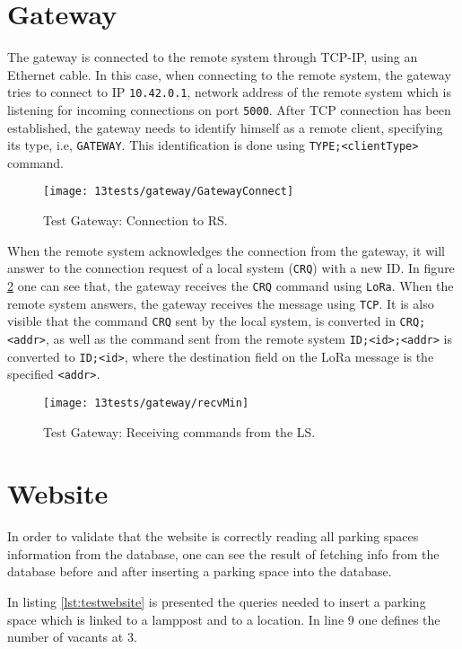 \section{Gateway}
The gateway is connected to the remote system through TCP-IP, using an Ethernet cable. In this case, when connecting to the remote system, the gateway tries to connect to IP \verb|10.42.0.1|, network address of the remote system which is listening for incoming connections on port \verb|5000|. After TCP connection has been established, the gateway needs to identify himself as a remote client, specifying its type, i.e, \verb|GATEWAY|. This identification is done using \verb|TYPE;<clientType>| command.

\begin{figure}[H]
	\centering	
	\texttt{[image: 13tests/gateway/GatewayConnect]}
	\caption{Test Gateway: Connection to RS.}
	\label{fig:}
\end{figure}

When the remote system acknowledges the connection from the gateway, it will answer to the connection request of a local system (\verb|CRQ|) with a new ID. In figure \ref{fig:recvMin} one can see that, the gateway receives the \verb|CRQ| command using \verb|LoRa|. When the remote system answers, the gateway receives the message using \verb|TCP|. It is also visible that the command \verb|CRQ| sent by the local system, is converted in \verb|CRQ;<addr>|, as well as the command sent from the remote system \verb|ID;<id>;<addr>| is converted to \verb|ID;<id>|, where the destination field on the LoRa message is the specified \verb|<addr>|.

\begin{figure}[H]
	\centering	
	\texttt{[image: 13tests/gateway/recvMin]}
	\caption{Test Gateway: Receiving commands from the LS.}
	\label{fig:recvMin}
\end{figure}

\clearpage
\section{Website}
In order to validate that the website is correctly reading all parking spaces information from the database, one can see the result of fetching info from the database before and after inserting a parking space into the database.

In listing \ref{lst:testwebsite} is presented the queries needed to insert a parking space which is linked to a lamppost and to a location. In line 9 one defines the number of vacants at 3.

